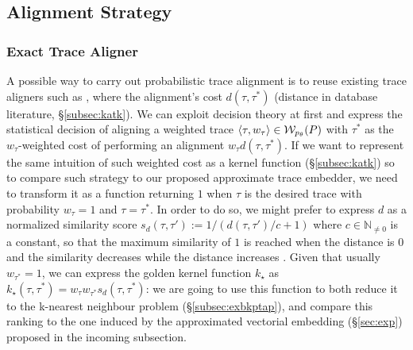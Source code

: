 
\subsection{Alignment Strategy}

\subsubsection{Exact Trace Aligner}\label{subsec:eta}
{A possible way to carry out probabilistic trace alignment is to reuse existing trace aligners such as \cite{LeoniM17}, where the alignment's cost $d(\tau,\tau^*)$ (distance in database literature, \S\ref{subsec:katk}). We can exploit decision theory at first \cite{dectheor} and express the statistical decision of aligning a weighted trace $\braket{\tau,w_\tau}\in\mathcal{W}_{p_\theta}(P)$ with $\tau^*$ as the $w_\tau$-weighted cost of performing an alignment $w_\tau d(\tau,\tau^*)$. If we want to represent the same intuition of such weighted cost as a kernel function (\S\ref{subsec:katk}) so to compare such strategy to our proposed approximate trace embedder, we need to transform it as a function returning $1$  when $\tau$ is the desired trace with probability $w_\tau=1$ and $\tau=\tau^*$. In order to do so, we might prefer to express $d$ as}
 a normalized similarity score $s_d(\tau,\tau'):=1/(d(\tau,\tau')/c+1)$ where $c\in\mathbb{N}_{\neq 0}$ is a constant, so that the maximum similarity of $1$ is reached when the distance is $0$ and the similarity decreases while the distance increases \cite{BergamiBM20}. %
 {Given that usually $w_{\tau^*}=1$, we can express the golden kernel function $k_\star$ as $k_\star(\tau,\tau^*)=w_\tau w_{\tau^*} s_d(\tau,\tau^*)$: we are going to use this function to both }%
 reduce {it} to the k-nearest neighbour problem{ (\S\ref{subsec:exbkptap}), and compare this ranking to the one induced by the approximated vectorial embedding (\S\ref{sec:exp}) proposed in the incoming subsection.}

